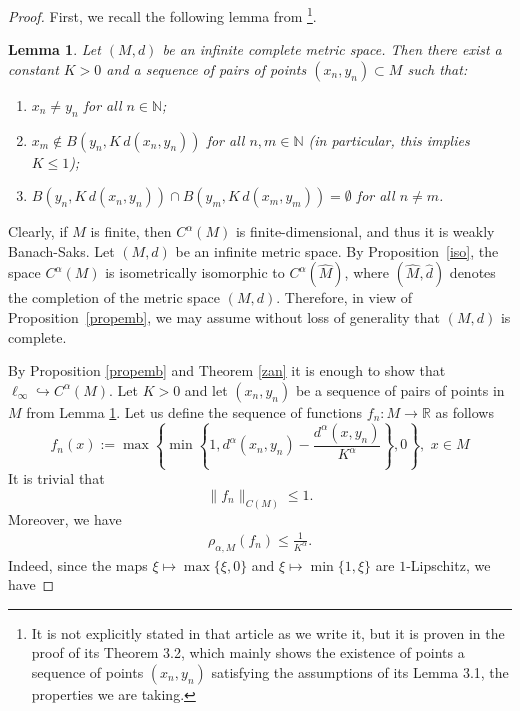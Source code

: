 \documentclass[11pt, reqno]{amsart}
\newcommand\boldred[1]{\textcolor{red}{\textbf{#1}}} %
\newtheorem{lemma}[thm]{Lemma}
\begin{document}
\begin{proof}
First, we recall the following lemma from \cite{cuth_structure_2016}\footnote{It is not explicitly stated in that article as we write it, but it is proven in the proof of its Theorem 3.2, which mainly shows the existence of points a sequence of points $(x_n,y_n)$ satisfying the assumptions of its Lemma 3.1, the properties we are taking.}.

\begin{lemma}\label{ciagi}
Let $(M,d)$ be an infinite complete metric space. Then there exist a constant $K>0$ and a sequence of pairs of points $(x_n,y_n) \subset M$ such that:
\begin{enumerate}[label=(\roman*)]
    \item $x_n \neq y_n$ for all $n \in \mathbb{N}$;
    \item $x_m \notin B(y_n, K \, d(x_n,y_n))$ for all $n,m \in \mathbb{N}$ (in particular, this implies $K \leq 1$);
    \item $B(y_n, K \, d(x_n,y_n)) \cap B(y_m, K \, d(x_m,y_m)) = \emptyset$ for all $n \neq m$.
\end{enumerate}
\end{lemma}
Clearly, if $M$ is finite, then $C^{\alpha}(M)$ is finite-dimensional, and thus it is weakly Banach-Saks.
Let $(M, d)$ be an infinite metric space. By Proposition~\ref{iso}, the space $C^\alpha(M)$ is isometrically isomorphic to $C^\alpha(\widehat{M})$, where $(\widehat{M},\widehat{d})$ denotes the completion of the metric space $(M,d)$. Therefore, in view of Proposition~\ref{propemb}, we may assume without loss of generality that $(M,d)$ is complete.



By Proposition \ref{propemb} and Theorem \ref{zan} it is enough to show that $\ell_{\infty} \hookrightarrow C^\alpha(M)$.
Let $K>0$ and let $(x_n,y_n)$ be a sequence of pairs of points in $M$ from Lemma \ref{ciagi}.
   Let us define the sequence of functions $f_n :M \rightarrow \mathbb{R}$ as follows 
    $$
    f_n(x):=\max\left\{ \min\left\{1,d^{\alpha}(x_n,y_n)-\frac{d^\alpha(x,y_n)}{K^\alpha}\right\}, 0 \right\},  \,\, x \in M
    $$
     It is trivial that 
     \[
     \lVert f_n\rVert_{C(M)}\leq 1.
     \]
     Moreover, we have
     \begin{eqnarray} \label{oszacowania}
       \rho_{\alpha, M}(f_n)\leq \frac{1}{K^\alpha}.
     \end{eqnarray}
     Indeed, since the maps $\xi \mapsto \max\{\xi, 0\}$ and $\xi \mapsto \min\{1, \xi\}$ are $1$-Lipschitz, we have 
     

\end{proof}
\end{document}
